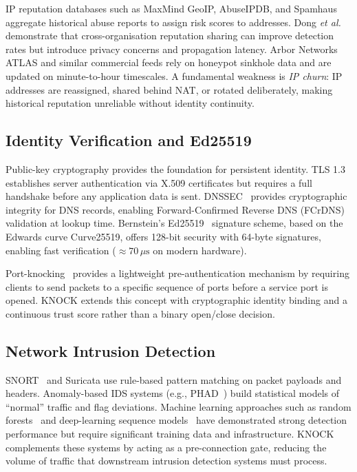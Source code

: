 \documentclass[10pt,conference]{IEEEtran}
\begin{document}
IP reputation databases such as MaxMind GeoIP, AbuseIPDB, and Spamhaus
aggregate historical abuse reports to assign risk scores to addresses.
Dong \emph{et al.}~\cite{dong2012rep} demonstrate that cross-organisation
reputation sharing can improve detection rates but introduce privacy
concerns and propagation latency.  Arbor Networks ATLAS and similar
commercial feeds rely on honeypot sinkhole data and are updated on
minute-to-hour timescales.  A fundamental weakness is \emph{IP churn}:
IP addresses are reassigned, shared behind NAT, or rotated deliberately,
making historical reputation unreliable without identity continuity.

\subsection{Identity Verification and Ed25519}

Public-key cryptography provides the foundation for persistent identity.
TLS 1.3~\cite{rfc8446} establishes server authentication via X.509
certificates but requires a full handshake before any application
data is sent.  DNSSEC~\cite{rfc4033} provides cryptographic integrity
for DNS records, enabling Forward-Confirmed Reverse DNS (FCrDNS)
validation at lookup time.  Bernstein's Ed25519~\cite{bernstein2012ed25519}
signature scheme, based on the Edwards curve Curve25519, offers 128-bit
security with 64-byte signatures, enabling fast verification
($\approx\!70\,\mu\mathrm{s}$ on modern hardware).

Port-knocking~\cite{portknocking2003} provides a lightweight
pre-authentication mechanism by requiring clients to send packets to a
specific sequence of ports before a service port is opened.  KNOCK
extends this concept with cryptographic identity binding and a
continuous trust score rather than a binary open/close decision.

\subsection{Network Intrusion Detection}

SNORT~\cite{roesch1999snort} and Suricata use rule-based pattern
matching on packet payloads and headers.  Anomaly-based IDS systems
(e.g., PHAD~\cite{mahoney2003phad}) build statistical models of
``normal'' traffic and flag deviations.  Machine learning approaches
such as random forests~\cite{sommer2010outside} and deep-learning
sequence models~\cite{mirsky2018kitsune} have demonstrated strong
detection performance but require significant training data and
infrastructure.  KNOCK complements these systems by acting as a
pre-connection gate, reducing the volume of traffic that downstream
intrusion detection systems must process.
\end{document}
